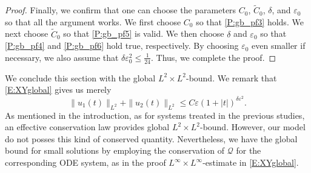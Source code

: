 \documentclass[11pt,a4paper,oneside]{amsart}
\theoremstyle{plain}
\theoremstyle{remark}
\numberwithin{equation}{section}
\def\le{\leqslant}
\newcommand{\eps}{\varepsilon}
\theoremstyle{definition}
\begin{document}
\begin{proof}
Finally, we confirm that one can choose the parameters
$C_0$, $\widetilde{C}_0$, $\delta$, and $\eps_0$ so that 
all the argument works.
We first choose $C_0$ so that
\eqref{P:gb_pf3} holds.
We next choose $\widetilde{C}_0$ so that \eqref{P:gb_pf5} is valid.
We then choose $\delta$ and $\eps_0$ so that \eqref{P:gb_pf4} and \eqref{P:gb_pf6} hold true, respectively.
By choosing $\eps_0$ even smaller if necessary, we also assume that
$\delta \eps_0^2 \le \frac1{24}$.
Thus, we complete the proof.
\end{proof}

We conclude this section with the global $L^2\times L^2$-bound. We remark that \eqref{E:XYglobal} gives us merely
\[
	\| u_1(t)\|_{L^2}+\| u_2(t)\|_{L^2} \le C \eps (1+|t|)^{\delta \eps^2}.
\]
As mentioned in the introduction, as for systems treated in the previous studies, an effective
conservation law provides global $L^2\times L^2$-bound.
However, our model do not posses this kind of conserved quantity.
Nevertheless, we have the global bound for small solutions
by employing the conservation of $\mathcal{Q}$ for the corresponding ODE system, as in the proof $L^\infty \times L^\infty$-estimate in \eqref{E:XYglobal}.
\end{document}
